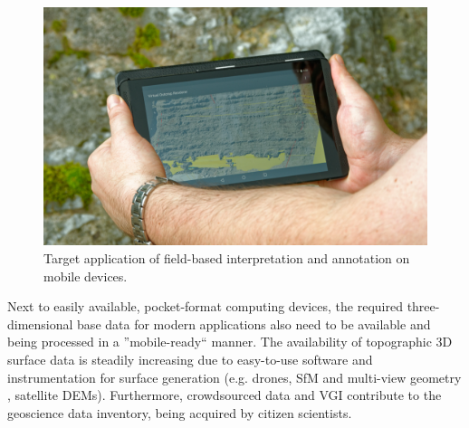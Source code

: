 \documentclass[review]{elsarticle}
\begin{document}
\begin{figure}[htbp]
\begin{center}
	\includegraphics[width=0.95\linewidth]{graphics/GRIT_overhands}
	\caption{Target application of field-based interpretation and annotation on mobile devices.}
	\label{fig:intro:mobileInterpretationInField}
\end{center}
\end{figure}


Next to easily available, pocket-format computing devices, the required three-dimensional base data for modern applications also need to be available and being processed in a ''mobile-ready`` manner. The availability of topographic 3D surface data is steadily increasing due to easy-to-use software and instrumentation for surface generation (e.g. drones, \gls{SfM} \cite{Wu2013} and multi-view geometry \cite{Goesele2007}, satellite \glspl{DEM}). Furthermore, crowdsourced data and \gls{VGI} contribute to the geoscience data inventory, being acquired by citizen scientists. %
\end{document}
